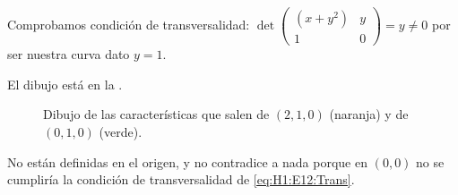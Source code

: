 \begin{problem}[12]
	\spart

	Comprobamos condición de transversalidad: \( \det \begin{pmatrix} (x+y^2) & y \\ 1 & 0 \end{pmatrix} = y ≠ 0 \label{eq:H1:E12:Trans} \) por ser nuestra curva dato $y = 1$.

	\spart

	El dibujo está en la .

	\begin{figure}
	\centering
	\caption{Dibujo de las características que salen de $(2,1,0)$ (naranja) y de $(0,1,0)$ (verde).}
	\label{fig:Hoja1:E12}
	\end{figure}

	\spart

	No están definidas en el origen, y no contradice a nada porque en $(0,0)$ no se cumpliría la condición de transversalidad de \eqref{eq:H1:E12:Trans}.

\end{problem}


